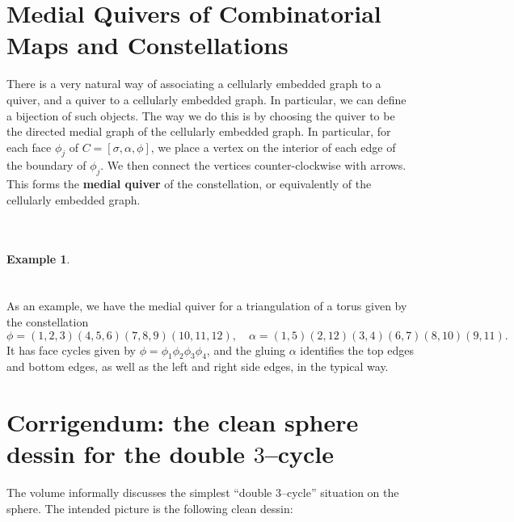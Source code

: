 \documentclass[11pt,oneside]{amsbook}
\numberwithin{equation}{section}
\theoremstyle{plain}
\theoremstyle{definition}
\newtheorem{ex}[theorem]{Example}
\theoremstyle{remark}
\begin{document}
	\noindent
	\vfill
	
	
	
	\section{Medial Quivers of Combinatorial Maps and Constellations}
	There is a very natural way of associating a cellularly embedded graph to a quiver, and a quiver to a cellularly embedded graph. In particular, we can define a bijection of such objects. The way we do this is by choosing the quiver to be the directed medial graph of the cellularly embedded graph. In particular, for each face $\phi_j$ of $C=[\sigma, \alpha, \phi]$, we place a vertex on the interior of each edge of the boundary of $\phi_j$. We then connect the vertices counter-clockwise with arrows. This forms the \textbf{medial quiver} of the constellation, or equivalently of the cellularly embedded graph.\\
	\
	\\
	\
	\\
	
	\begin{ex}
		\noindent
		\\
		\
		\\
		\
		\\
		As an example, we have the medial quiver for a triangulation of a torus given by the constellation
		\[ \phi = (1,2,3)(4,5,6)(7,8,9)(10,11,12), \quad \alpha = (1,5)(2,12)(3,4)(6,7)(8,10)(9,11 ). \]
		It has face cycles given by $\phi = \phi_1 \phi_2 \phi_3 \phi_4$, and the gluing $\alpha$ identifies the top edges and bottom edges, as well as the left and right side edges, in the typical way. 
	\end{ex}


\section{Corrigendum: the clean sphere dessin for the double \texorpdfstring{$3$}{3}--cycle}
\label{sec:corrigendum_sphere}

The  volume informally discusses the simplest ``double $3$--cycle'' situation on the sphere.
The intended picture is the following clean dessin:
\end{document}
